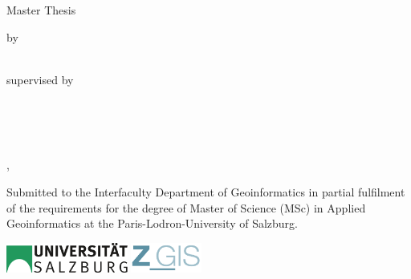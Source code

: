 %
\begin{titlepage}
    \begin{center}
        \large

        \hfill

        \vfill

        \begingroup
            \color{Maroon}\spacedallcaps{\myTitle} \\ \bigskip
        \endgroup

        \spacedlowsmallcaps{\mySubtitle} \\ \medskip

        \vfill

        Master Thesis

        \vfill


        by \\
        \myName \\

        \vfill

        supervised by \\
        \mySupervisor \\
        \myOtherSupervisor \\

        \vfill

        \myDepartment \\

        \vfill

        \myLocation, \myTime\

        \vfill

    \end{center}

    \vfill

    \begin{footnotesize}
    \raggedright
    Submitted to the Interfaculty Department of Geoinformatics in partial
    fulfilment of the requirements for the degree of Master of Science (MSc)
    in Applied Geoinformatics at the Paris-Lodron-University of Salzburg.
    \end{footnotesize}

    \vfil

    \includegraphics[height=1cm]{source/figures/uni_logo.png}\hfill
    \includegraphics[height=1cm]{source/figures/zgis_logo16_new.png}\hfill

\end{titlepage}
